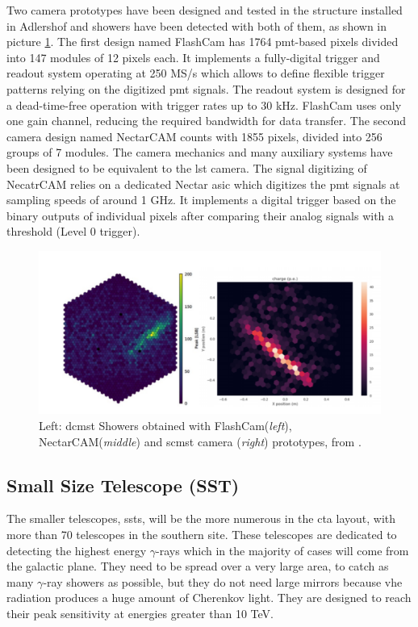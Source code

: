 \documentclass[main.tex]{subfiles}
\begin{document}
Two camera prototypes have been designed and tested in the structure installed in Adlershof and showers have been detected with both of them, as shown in picture \ref{fig:MSTcamerasimg}.
The first design named FlashCam has 1764 \gls{pmt}-based pixels divided into 147 modules of 12 pixels each. It implements a fully-digital trigger and readout system operating at 250 MS/s which allows to define flexible trigger patterns relying on the digitized \gls{pmt} signals. The readout system is designed for a dead-time-free operation with trigger rates up to 30 kHz. FlashCam uses only one gain channel, reducing the required bandwidth for data transfer.
The second camera design named NectarCAM counts with 1855 pixels, divided into 256 groups of 7 modules. The camera mechanics and many auxiliary systems have been designed to be equivalent to the \gls{lst} camera. The signal digitizing of NecatrCAM relies on a dedicated Nectar \gls{asic} which digitizes the \gls{pmt} signals at sampling speeds of around 1 GHz. It implements a digital trigger based on the binary outputs of individual pixels after comparing their analog signals with a threshold (Level 0 trigger).

\begin{figure}[h]
  \centering
  \includegraphics[width=\textwidth]{Pictures/showerimagesMST.pdf}
  \caption{Left: \gls{dcmst} Showers obtained with FlashCam(\textit{left}), NectarCAM(\textit{middle}) and \gls{scmst} camera (\textit{right}) prototypes, from \cite{2019MSTreport}.}
  \label{fig:MSTcamerasimg}
\end{figure}

\subsection{Small Size Telescope (SST)}

The smaller telescopes, \glspl{sst}, will be the more numerous in the \gls{cta} layout, with more than 70 telescopes in the southern site. These telescopes are dedicated to detecting the highest energy $\gamma$-rays which in the majority of cases will come from the galactic plane. They need to be spread over a very large area, to catch as many $\gamma$-ray showers as possible, but they do not need large mirrors because \gls{vhe} radiation produces a huge amount of Cherenkov light. They are designed to reach their peak sensitivity at energies greater than 10 TeV.
\end{document}
